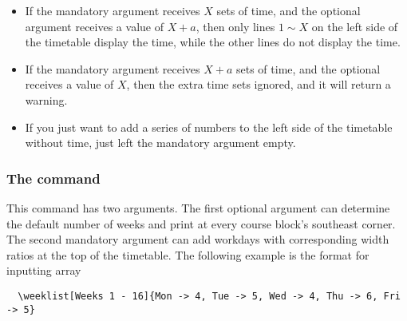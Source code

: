 \documentclass[letterpaper]{l3doc}
\newenvironment{example}{\begin{list}{}{\leftmargin=\parindent}\item }{\end{list}}
\begin{document}
\begin{itemize}
  \item If the mandatory argument receives $X$ sets of time, and the optional argument receives a value of $X+a$, then only lines $1\sim X$ on the left side of the timetable display the time, while the other lines do not display the time.
  \item If the mandatory argument receives $X+a$ sets of time, and the optional receives a value of $X$, then the extra time sets ignored, and it will return a warning.
  \item If you just want to add a series of numbers to the left side of the timetable without time, just left the mandatory argument empty.
\end{itemize}

\subsubsection{The  command}

\begin{example}
  \qquad
\end{example}

This command has two arguments. The first optional argument can determine the default number of weeks and print at every course block's southeast corner. The second mandatory argument can add workdays with corresponding width ratios at the top of the timetable. The following example is the format for inputting array

\begin{Verbatim}
  \weeklist[Weeks 1 - 16]{Mon -> 4, Tue -> 5, Wed -> 4, Thu -> 6, Fri -> 5}
\end{Verbatim}

\begin{figure}[htbp]
  \centering
\end{figure}
\end{document}
